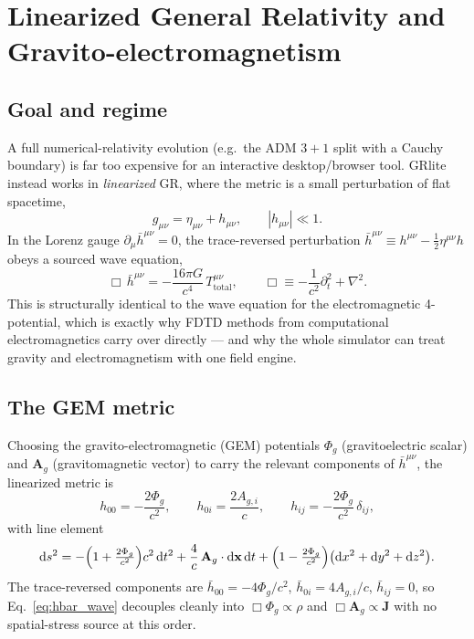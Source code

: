 \documentclass[11pt]{article}
\newcommand{\Phig}{\Phi_g}                 %
\newcommand{\Ag}{\mathbf{A}_g}             %
\newcommand{\vv}[1]{\mathbf{#1}}           %
\newcommand{\dd}{\mathrm{d}}               %
\begin{document}
\section{Linearized General Relativity and Gravito-electromagnetism}
\label{sec:lingr}

\subsection{Goal and regime}

A full numerical-relativity evolution (e.g.\ the ADM $3{+}1$ split with a Cauchy
boundary) is far too expensive for an interactive desktop/browser tool.  GRlite
instead works in \emph{linearized} GR, where the metric is a small perturbation
of flat spacetime,
\begin{equation}
  g_{\mu\nu} = \eta_{\mu\nu} + h_{\mu\nu}, \qquad |h_{\mu\nu}| \ll 1 .
\end{equation}
In the Lorenz gauge $\partial_\mu \bar h^{\mu\nu}=0$, the trace-reversed
perturbation $\bar h^{\mu\nu} \equiv h^{\mu\nu} - \tfrac12 \eta^{\mu\nu} h$
obeys a sourced wave equation,
\begin{equation}
\label{eq:hbar_wave}
  \Box\, \bar h^{\mu\nu} = -\frac{16\pi G}{c^4}\, T^{\mu\nu}_{\mathrm{total}},
  \qquad \Box \equiv -\frac{1}{c^2}\partial_t^2 + \nabla^2 .
\end{equation}
This is structurally identical to the wave equation for the electromagnetic
4-potential, which is exactly why FDTD methods from computational
electromagnetics carry over directly --- and why the whole simulator can treat
gravity and electromagnetism with one field engine.

\subsection{The GEM metric}
\label{sec:gem_metric}

Choosing the gravito-electromagnetic (GEM) potentials $\Phig$ (gravitoelectric
scalar) and $\Ag$ (gravitomagnetic vector) to carry the relevant components of
$\bar h^{\mu\nu}$, the linearized metric is
\begin{equation}
\label{eq:gem_metric}
  h_{00} = -\frac{2\Phig}{c^2}, \qquad
  h_{0i} = \frac{2 A_{g,i}}{c}, \qquad
  h_{ij} = -\frac{2\Phig}{c^2}\,\delta_{ij},
\end{equation}
with line element
\begin{equation}
\label{eq:gem_line}
  \dd s^2 = -\Bigl(1+\tfrac{2\Phig}{c^2}\Bigr)c^2\,\dd t^2
            + \frac{4}{c}\,\Ag\cdot\dd\vv{x}\,\dd t
            + \Bigl(1-\tfrac{2\Phig}{c^2}\Bigr)\bigl(\dd x^2+\dd y^2+\dd z^2\bigr).
\end{equation}
The trace-reversed components are $\bar h_{00} = -4\Phig/c^2$,
$\bar h_{0i} = 4 A_{g,i}/c$, $\bar h_{ij}=0$, so
Eq.~\eqref{eq:hbar_wave} decouples cleanly into
$\Box\Phig \propto \rho$ and $\Box\Ag \propto \vv{J}$ with no spatial-stress
source at this order.
\end{document}
